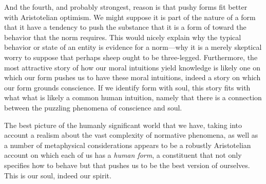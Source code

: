 And the fourth, and probably strongest, reason is that pushy forms fit better with Aristotelian optimism. We might 
suppose it is part of 
the nature of a form that it have a tendency to push the substance that it is a form of toward the behavior 
that the norm requires. This would nicely explain why the typical behavior or state of an entity is evidence for 
a norm---why it is a merely skeptical worry to suppose that perhaps sheep ought to be three-legged.  Furthermore,
the most attractive story of how our moral intuitions yield knowledge is likely one on which our form pushes us 
to have these moral intuitions, indeed a story on which our form grounds conscience. If we identify form with soul,
this story fits with what what is likely a common human intuition, namely that there is a connection between the 
puzzling phenomena of conscience and soul. 

The best picture of the humanly significant world that we have, taking into account a realism about the vast complexity of 
normative phenomena, as well as a number of metaphysical considerations appears to be a robustly Aristotelian
account on which each of us has a \textit{human form}, a constituent that not only specifies how to behave but that
pushes us to be the best version of ourselves. This is our soul, indeed our spirit.

\chaptertail
